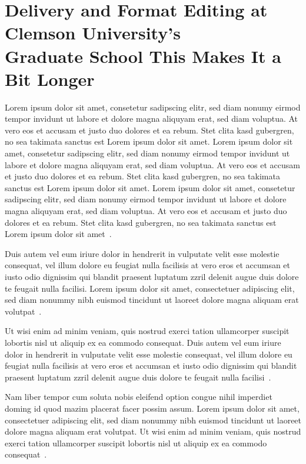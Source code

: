 \section{Delivery and Format Editing at Clemson University's\\Graduate School This Makes It a Bit Longer}
Lorem ipsum dolor sit amet, consetetur sadipscing elitr,  sed diam nonumy eirmod
tempor invidunt ut labore et dolore magna aliquyam erat, sed diam voluptua. At
vero eos et accusam et justo duo dolores et ea rebum. Stet clita kasd gubergren,
no sea takimata sanctus est Lorem ipsum dolor sit amet. Lorem ipsum dolor sit
amet, consetetur sadipscing elitr,  sed diam nonumy eirmod tempor invidunt ut
labore et dolore magna aliquyam erat, sed diam voluptua. At vero eos et accusam
et justo duo dolores et ea rebum. Stet clita kasd gubergren, no sea takimata
sanctus est Lorem ipsum dolor sit amet. Lorem ipsum dolor sit amet, consetetur
sadipscing elitr,  sed diam nonumy eirmod tempor invidunt ut labore et dolore
magna aliquyam erat, sed diam voluptua. At vero eos et accusam et justo duo
dolores et ea rebum. Stet clita kasd gubergren, no sea takimata sanctus est
Lorem ipsum dolor sit amet~\cite{dutt:doaws}.

Duis autem vel eum iriure dolor in hendrerit in vulputate velit esse molestie
consequat, vel illum dolore eu feugiat nulla facilisis at vero eros et accumsan
et iusto odio dignissim qui blandit praesent luptatum zzril delenit augue duis
dolore te feugait nulla facilisi. Lorem ipsum dolor sit amet, consectetuer
adipiscing elit, sed diam nonummy nibh euismod tincidunt ut laoreet dolore
magna aliquam erat volutpat~\cite{erti:ktsas}.

Ut wisi enim ad minim veniam, quis nostrud exerci tation ullamcorper suscipit
lobortis nisl ut aliquip ex ea commodo consequat. Duis autem vel eum iriure
dolor in hendrerit in vulputate velit esse molestie consequat, vel illum dolore
eu feugiat nulla facilisis at vero eros et accumsan et iusto odio dignissim qui
blandit praesent luptatum zzril delenit augue duis dolore te feugait nulla
facilisi~\cite{gamm:dpeor}.

Nam liber tempor cum soluta nobis eleifend option congue nihil imperdiet doming
id quod mazim placerat facer possim assum. Lorem ipsum dolor sit amet,
consectetuer adipiscing elit, sed diam nonummy nibh euismod tincidunt ut laoreet
dolore magna aliquam erat volutpat. Ut wisi enim ad minim veniam, quis nostrud
exerci tation ullamcorper suscipit lobortis nisl ut aliquip ex ea commodo
consequat~\cite{gay:sdpft}.

